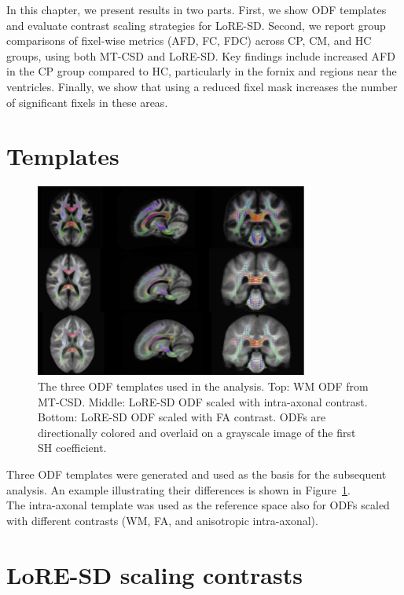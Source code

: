 In this chapter, we present results in two parts. First, we show ODF templates and evaluate contrast scaling strategies for LoRE-SD. Second, we report group comparisons of fixel-wise metrics (AFD, FC, FDC) across CP, CM, and HC groups, using both MT-CSD and LoRE-SD. Key findings include increased AFD in the CP group compared to HC, particularly in the fornix and regions near the ventricles. Finally, we show that using a reduced fixel mask increases the number of significant fixels in these areas.

\section{Templates}

\begin{figure}[h!]
  \centering
  \includegraphics[width=0.8\textwidth]{Images/template_new.jpg} %
  \caption{The three ODF templates used in the analysis. Top: WM ODF from MT-CSD. Middle: LoRE-SD ODF scaled with intra-axonal contrast. Bottom: LoRE-SD ODF scaled with FA contrast. ODFs are directionally colored and overlaid on a grayscale image of the first SH coefficient.}
  \label{fig:template_odf}
\end{figure}

Three ODF templates were generated and used as the basis for the subsequent analysis. An example illustrating their differences is shown in Figure~\ref{fig:template_odf}. 
\\The intra-axonal template was used as the reference space also for ODFs scaled with different contrasts (WM, FA, and anisotropic intra-axonal).


\section{LoRE-SD scaling contrasts}
\label{sec:cont}

